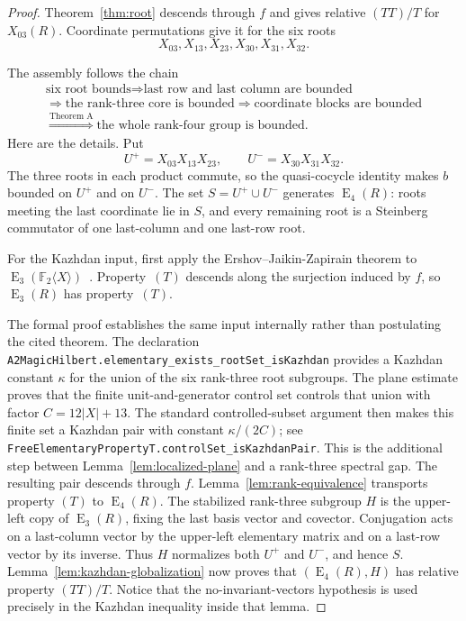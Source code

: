 \documentclass[11pt]{amsart}
\theoremstyle{definition}
\theoremstyle{plain}
\newcommand{\F}{\mathbb F}
\newcommand{\EL}{\operatorname{E}}
\begin{document}
\begin{proof}
Theorem~\ref{thm:root} descends through \(f\) and gives relative
\((TT)/T\) for \(X_{03}(R)\).  Coordinate permutations give it for
the six roots
\[
  X_{03},X_{13},X_{23},X_{30},X_{31},X_{32}.
\]

The assembly follows the chain
\[
 \boxed{
 \begin{gathered}
   \text{six root bounds}
   \Longrightarrow \text{last row and last column are bounded}\\
   \Longrightarrow \text{the rank-three core is bounded}
   \Longrightarrow \text{coordinate blocks are bounded}\\
   \overset{\text{Theorem A}}{\Longrightarrow}
   \text{the whole rank-four group is bounded}.
 \end{gathered}}
\]
Here are the details.  Put
\[
  U^+=X_{03}X_{13}X_{23},
  \qquad U^-=X_{30}X_{31}X_{32}.
\]
The three roots in each product commute, so the quasi-cocycle
identity makes \(b\) bounded on \(U^+\) and on \(U^-\).  The set
\(S=U^+\cup U^-\) generates \(\EL_4(R)\): roots meeting the last
coordinate lie in \(S\), and every remaining root is a Steinberg
commutator of one last-column and one last-row root.

For the Kazhdan input, first apply the
Ershov--Jaikin-Zapirain theorem to
\(\EL_3(\F_2\langle X\rangle)\)~\cite{ErshovJaikin}.  Property~\((T)\)
descends along the surjection induced by \(f\), so \(\EL_3(R)\) has
property~\((T)\).

The formal proof establishes the same input internally rather than
postulating the cited theorem.  The declaration
\nolinkurl{A2MagicHilbert.elementary_exists_rootSet_isKazhdan}
provides a Kazhdan constant \(\kappa\) for the union of the six
rank-three root subgroups.  The plane estimate proves that the finite
unit-and-generator control set controls that union with factor
\(C=12\lvert X\rvert+13\).  The standard controlled-subset argument
then makes this finite set a Kazhdan pair with constant
\(\kappa/(2C)\); see
\nolinkurl{FreeElementaryPropertyT.controlSet_isKazhdanPair}.  This is
the additional step between Lemma~\ref{lem:localized-plane} and a
rank-three spectral gap.  The resulting pair descends through \(f\).
Lemma~\ref{lem:rank-equivalence} transports property
\((T)\) to \(\EL_4(R)\).  The stabilized rank-three subgroup
\(H\) is the upper-left copy of \(\EL_3(R)\), fixing the last basis
vector and covector.  Conjugation acts on a last-column vector by the
upper-left elementary matrix and on a last-row vector by its inverse.
Thus \(H\) normalizes both \(U^+\) and \(U^-\), and hence \(S\).
Lemma~\ref{lem:kazhdan-globalization} now proves that
\((\EL_4(R),H)\) has relative property \((TT)/T\).  Notice that the
no-invariant-vectors hypothesis is used precisely in the Kazhdan
inequality inside that lemma.


\end{proof}
\end{document}
